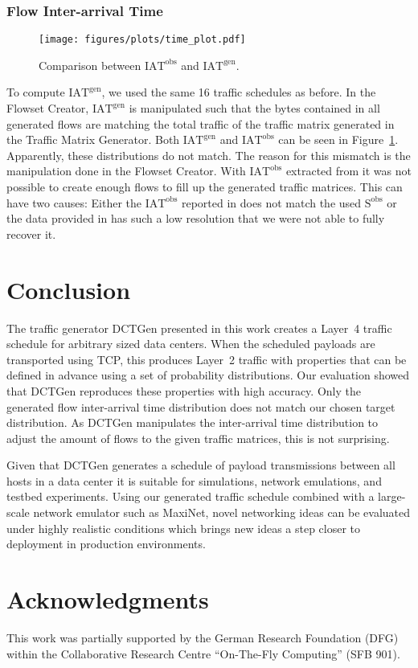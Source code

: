 \documentclass[journal,10pt]{IEEEtran}
\newcommand{\genname}{DCTGen}
\newcommand{\lf}{Layer~4}
\newcommand{\iat}[1] {\ensuremath{\mathrm{IAT}^{\mathrm{#1}}}}
\newcommand{\size}[1]{\ensuremath{\mathrm{S}  ^{\mathrm{#1}}}}
\begin{document}
		
		\subsubsection{Flow Inter-arrival Time}

		\begin{figure}
			\centering
				\texttt{[image: figures/plots/time\_plot.pdf]}
				\caption{Comparison between \iat{obs} and \iat{gen}.}
				\label{fig:time_plot}
\end{figure}
		
		To compute \iat{gen}, we used the same 16 traffic schedules as before.
		In the Flowset Creator, \iat{gen} is manipulated such that the bytes contained in all generated flows
		are matching the total traffic of the traffic matrix generated in the Traffic Matrix Generator.
		Both \iat{gen} and \iat{obs} can be seen in Figure~\ref{fig:time_plot}.
		Apparently, these distributions do not match.
		The reason for this mismatch is the manipulation done in the Flowset Creator.
		With \iat{obs} extracted from \cite{MSR-datacenters} it was not possible to
		create enough flows to fill up the generated traffic matrices.
		This can have two causes: Either the
		\iat{obs} reported in \cite{MSR-datacenters} does not match the used \size{obs} or the data provided in \cite{MSR-datacenters}
		has such a low resolution that we were not able to fully recover it.






\section{Conclusion}
\label{sec:conclusion}	 
	The traffic generator \genname{} presented in this work creates a \lf{} traffic schedule for arbitrary sized data centers.
	When the scheduled payloads are transported using TCP, this produces Layer~2 traffic
	with properties that can be defined in advance using a set of probability distributions.
	Our evaluation showed that \genname{} reproduces these properties with high accuracy.
	Only the generated flow inter-arrival time distribution does not match our chosen target distribution.
	As \genname{} manipulates the inter-arrival time distribution to
	adjust the amount of flows to the given traffic matrices, this is not surprising.


	Given that \genname{} generates a schedule of payload transmissions between all hosts in a data center
	it is suitable for simulations, network emulations, and testbed experiments. 
	Using our generated traffic schedule combined with a large-scale network emulator such as MaxiNet,
	novel networking ideas can be evaluated under highly realistic conditions which 
	brings new ideas a step closer to deployment in production environments.


\section*{Acknowledgments}
	This work was partially supported by the German Research Foundation (DFG) within the Collaborative Research Centre ``On-The-Fly Computing'' (SFB 901).

{}

\end{document}
